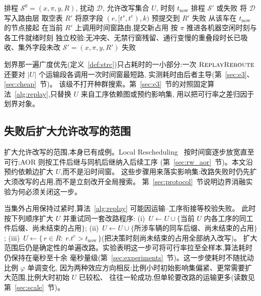 \documentclass[manuscript,screen,review]{acmart}
\begin{document}
\begin{algorithm}[t]
\caption{第 1 级改路重放 \(\textsc{ReplayReroute}\)}
\label{alg:replay}
\begin{algorithmic}[1]
\Require 排程 \(\mathcal{S}^0=(x,\pi,y,R)\), 扰动 \(\mathcal{D}\), 允许改写集合 \(U\), 时刻 \(t_{\mathrm{now}}\)
\Ensure 排程 \(\mathcal{S}'\) 或失败
\State 将 \(\mathcal{D}\) 写入路由层
\State 取空表 \(R'\)
  \State 将原字段 \((e,[t^s,t^e),k)\) 预提交到 \(R'\)
    \State \Return 失败
  \EndIf
\EndFor
{}
  \State 从该车在 \(t_{\mathrm{now}}\) 的节点接起 
  \State 在当前 \(R'\) 上调用时间窗路由,提交新占用
\EndFor
\State 按 \(\pi\) 推进各机器空闲时刻与各工件就绪时刻
\State 独立校验:无冲突、无禁行窗残留、通行变慢的重叠段时长已吸收、集外字段未改
  \State \Return \(\mathcal{S}'=(x,\pi,y,R')\)
\Else
  \State \Return 失败
\EndIf
\end{algorithmic}
\end{algorithm}

划界那一遍广度优先(定义~\ref{def:strc})只占耗时的一小部分:一次
\(\textsc{ReplayReroute}\) 还要对 \(|U|\) 个运输段各调用一次时间窗最短路,
实测耗时由后者主导(第~\ref{sec:e3}、\ref{sec:cheap}~节)。
该级不打开种群搜索。第~\ref{sec:e3}~节的对照固定算法~\ref{alg:replay},只替换 \(U\) 来自工序依赖图或预约影响集,
用以把可行率之差归因于划界对象。

\subsection{失败后扩大允许改写的范围}
\label{sec:scope_escalation}

扩大允许改写的范围,本身已有成例。Local Rescheduling~\cite{kuster2007local}
按时间窗逐步放宽直至可行;AOR 则按工件后继与同机后继纳入后续工序
(第~\ref{sec:rw_aor}~节)。本文沿预约依赖边扩大 \(U\),而不是沿时间窗。
这些步骤用来落实影响集:改路失败时仍先扩大须改写的占用,而不是立刻改开全局搜索。
第~\ref{sec:protocol}~节说明边界消融实验为何必须关闭这一步。

当集外占用保持过紧时,算法~\ref{alg:replay} 可能因运输--工序衔接等校验失败。
此时按下列顺序扩大 \(U\) 并重试同一套改路程序:
(i)~\(U\leftarrow U\cup\{\)当前 \(U\) 内各工序的同工件后缀、尚未结束的占用\(\}\);
(ii)~\(U\leftarrow U\cup\{\)所涉车辆的同车后缀、尚未结束的占用\(\}\);
(iii)~\(U\leftarrow\{\,r\in R:\ r.t^e>t_{\mathrm{now}}\,\}\)(把决策时刻尚未结束的占用全部纳入改写)。
扩大范围后仍是确定性的单遍改路。实验表明这一步可将可行率拉至全样本,算法耗时仍保持在毫秒至十余
毫秒量级(第~\ref{sec:experiments}~节)。这一步使耗时不随扰动比例 \(\varphi\) 单调变化,
因为两种效应方向相反:比例小时初始影响集偏紧、更常需要扩大范围,比例大时初始 \(U\) 已较松、
往往一轮成功,但单轮要改路的运输更多(读数见第~\ref{sec:scale}~节)。
\end{document}
